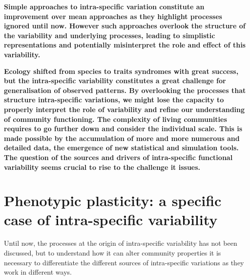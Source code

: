 %


\textbf{Simple approaches to intra-specific variation constitute an improvement over mean approaches as they highlight processes ignored until now. However such approaches overlook the structure of the variability and underlying processes, leading to simplistic representations and potentially misinterpret the role and effect of this variability.}


\textbf{%
Ecology shifted from species to traits syndromes with great success, but the intra-specific variability constitutes a great challenge for generalisation of observed patterns. By overlooking the processes that structure intra-specific variations, we might lose the capacity to properly interpret the role of variability and refine our understanding of community functioning. The complexity of living communities requires to go further down and consider the individual scale. This is made possible by the accumulation of more and more numerous and detailed data, the emergence of new statistical and simulation tools. The question of the sources and drivers of intra-specific functional variability seems crucial to rise to the challenge it issues.}



\section{Phenotypic plasticity: a specific case of intra-specific variability}

Until now, the processes at the origin of intra-specific variability has not been discussed, but to understand how it can alter community properties it is necessary to differentiate the different sources of intra-specific variations as they work in different ways.

